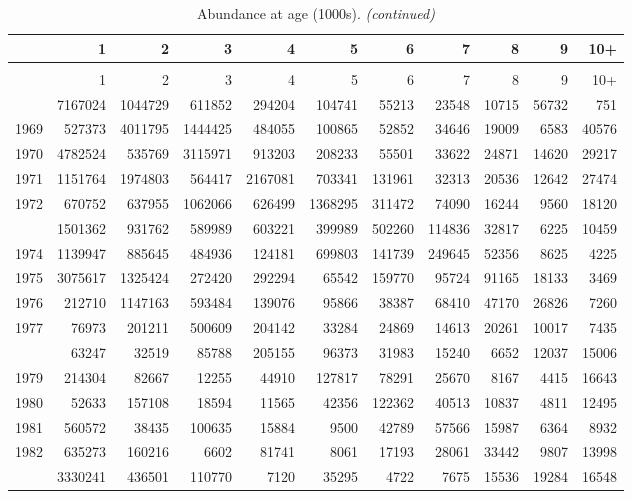 \documentclass[
]{article}
\begin{document}
\begin{longtable}[t]{lrrrrrrrrrr}
\caption{\label{tab:NAA-table}Abundance at age (1000s).}\\
\toprule
  & 1 & 2 & 3 & 4 & 5 & 6 & 7 & 8 & 9 & 10+\\
\midrule
\endfirsthead
\caption[]{Abundance at age (1000s). \textit{(continued)}}\\
\toprule
  & 1 & 2 & 3 & 4 & 5 & 6 & 7 & 8 & 9 & 10+\\
\midrule
\endhead

\endfoot
\bottomrule
\endlastfoot
1968 & 7167024 & 1044729 & 611852 & 294204 & 104741 & 55213 & 23548 & 10715 & 56732 & 751\\
1969 & 527373 & 4011795 & 1444425 & 484055 & 100865 & 52852 & 34646 & 19009 & 6583 & 40576\\
1970 & 4782524 & 535769 & 3115971 & 913203 & 208233 & 55501 & 33622 & 24871 & 14620 & 29217\\
1971 & 1151764 & 1974803 & 564417 & 2167081 & 703341 & 131961 & 32313 & 20536 & 12642 & 27474\\
1972 & 670752 & 637955 & 1062066 & 626499 & 1368295 & 311472 & 74090 & 16244 & 9560 & 18120\\
\addlinespace
1973 & 1501362 & 931762 & 589989 & 603221 & 399989 & 502260 & 114836 & 32817 & 6225 & 10459\\
1974 & 1139947 & 885645 & 484936 & 124181 & 699803 & 141739 & 249645 & 52356 & 8625 & 4225\\
1975 & 3075617 & 1325424 & 272420 & 292294 & 65542 & 159770 & 95724 & 91165 & 18133 & 3469\\
1976 & 212710 & 1147163 & 593484 & 139076 & 95866 & 38387 & 68410 & 47170 & 26826 & 7260\\
1977 & 76973 & 201211 & 500609 & 204142 & 33284 & 24869 & 14613 & 20261 & 10017 & 7435\\
\addlinespace
1978 & 63247 & 32519 & 85788 & 205155 & 96373 & 31983 & 15240 & 6652 & 12037 & 15006\\
1979 & 214304 & 82667 & 12255 & 44910 & 127817 & 78291 & 25670 & 8167 & 4415 & 16643\\
1980 & 52633 & 157108 & 18594 & 11565 & 42356 & 122362 & 40513 & 10837 & 4811 & 12495\\
1981 & 560572 & 38435 & 100635 & 15884 & 9500 & 42789 & 57566 & 15987 & 6364 & 8932\\
1982 & 635273 & 160216 & 6602 & 81741 & 8061 & 17193 & 28061 & 33442 & 9807 & 13998\\
\addlinespace
1983 & 3330241 & 436501 & 110770 & 7120 & 35295 & 4722 & 7675 & 15536 & 19284 & 16548\\

\end{longtable}
\end{document}
